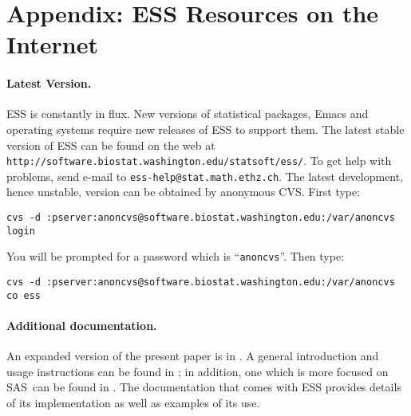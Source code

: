 \documentclass{article}
\def\url#1{\stexttt{#1}} %
\newcommand*{\SAS}{\textsc{SAS}}
\newcommand{\stexttt}[1]{{\small\texttt{#1}}}
\begin{document}






\clearpage

\appendix
\section{Appendix: ESS Resources on the Internet}
\label{sec:access}

\paragraph{Latest Version.}

ESS is constantly in flux.  New versions of statistical packages,
Emacs and operating systems require new releases of ESS to support
them.  The latest stable version of ESS can be found on the web at
\url{http://software.biostat.washington.edu/statsoft/ess/}.  To get
help with problems, send e-mail to \url{ess-help@stat.math.ethz.ch}.
The latest development, hence unstable, version can be obtained by
anonymous CVS.  First type:

\stexttt{cvs -d
  :pserver:anoncvs@software.biostat.washington.edu:/var/anoncvs login}

You will be prompted for a password which is ``\stexttt{anoncvs}''.
Then type:

\stexttt{cvs -d
  :pserver:anoncvs@software.biostat.washington.edu:/var/anoncvs co
  ess}

\paragraph{Additional documentation.}

An expanded version of the present paper is in \citep{RMHHS:2001}.  A
general introduction and usage instructions can be found in
\citep{heiberger:dsc:2001}; in addition, one which is more focused on
\SAS\ can be found in \citep{heiberger:philasugi:2001}.  The
documentation that comes with ESS provides details of its
implementation as well as examples of its use.
\end{document}
